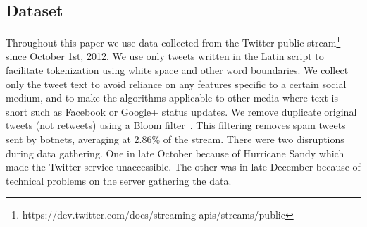 \documentclass[letterpaper,12pt,titlepage,oneside,final]{book}
\begin{document}
\subsection{Dataset}
Throughout this paper we use data collected from the Twitter public
stream\footnote{https://dev.twitter.com/docs/streaming-apis/streams/public}
since October 1st, 2012. 
We use only tweets written in the Latin script to facilitate tokenization
using white space and other word boundaries.
We collect only the tweet text to avoid reliance on any features specific to a
certain social medium,
and to make the algorithms applicable to other media where text is short such
as Facebook or Google+ status updates.
We remove duplicate original tweets
(not retweets) using a Bloom filter~\cite{metwally2005duplicate}.
This filtering removes spam tweets sent by botnets, averaging at 2.86\% of the stream. 
There were two disruptions during data gathering. 
One in late October because of Hurricane Sandy
which made the Twitter service unaccessible.
The other was in late December because of 
technical problems 
on the server gathering the data.





\end{document}
